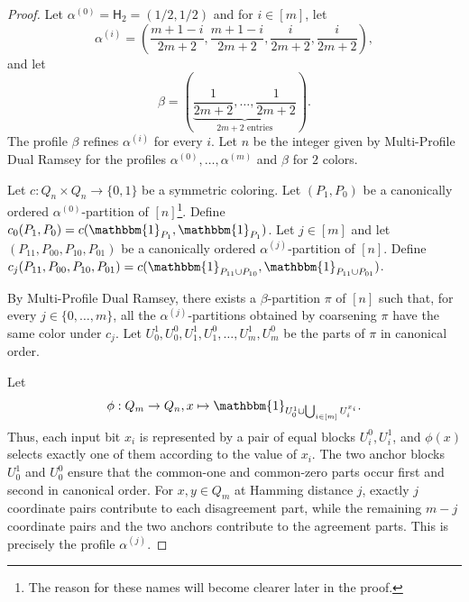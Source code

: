 \documentclass[11pt]{article}
\newcommand{\unif}[1]{\mathsf H_{#1}}
\theoremstyle{remark}
\begin{document}
\begin{proof}
Let $\alpha^{(0)} = \unif{2} = (1/2, 1/2)$ and for $i\in [m]$, let
\[
  \alpha^{(i)}
  =\left(
      \frac{m+1-i}{2m+2},
      \frac{m+1-i}{2m+2},
      \frac{i}{2m+2},
      \frac{i}{2m+2}
    \right),
\]
and let
\[
  \beta
  =\left(
      \underbrace{\frac1{2m+2},\ldots,\frac1{2m+2}}_{2m+2\text{ entries}}
    \right).
\]
The profile $\beta$ refines $\alpha^{(i)}$ for every $i$.
Let $n$ be the integer given by Multi-Profile Dual Ramsey for the profiles $\alpha^{(0)}, \ldots, \alpha^{(m)}$ and $\beta$ for $2$ colors.

Let $c : Q_n \times Q_n \to \{0, 1\}$ be a symmetric coloring.
Let $(P_1, P_0)$ be a canonically ordered $\alpha^{(0)}$-partition of $[n]$\footnote{The reason for these names will become clearer later in the proof.}.
Define $c_0(P_1, P_0) = c(\mathbbm{1}_{P_1}, \mathbbm{1}_{P_1})$.
Let $j \in [m]$ and let $(P_{11}, P_{00}, P_{10}, P_{01})$ be a canonically ordered $\alpha^{(j)}$-partition of $[n]$.
Define $c_j(P_{11}, P_{00}, P_{10}, P_{01}) = c(\mathbbm{1}_{P_{11} \cup P_{10}}, \mathbbm{1}_{P_{11} \cup P_{01}})$.

By Multi-Profile Dual Ramsey, there exists a $\beta$-partition $\pi$ of $[n]$ such that, for every $j \in \{0, \ldots, m\}$, all the $\alpha^{(j)}$-partitions obtained by coarsening $\pi$ have the same color under $c_j$.
Let $U_0^1, U_0^0, U_1^1, U_1^0, \ldots , U_m^1, U_m^0$ be the parts of $\pi$ in canonical order.

Let \[\phi : Q_m \to Q_n, x \mapsto \mathbbm{1}_{U_0^1 \cup \bigcup_{i \in [m]}U_i^{x_i}}.\]
Thus, each input bit $x_i$ is represented by a pair of equal blocks $U_i^0,U_i^1$, and $\phi(x)$ selects exactly one of them according to the value of $x_i$. 
The two anchor blocks $U_0^1$ and $U_0^0$ ensure that the common-one and common-zero parts occur first and second in canonical order.
For $x, y \in Q_m$ at Hamming distance $j$, exactly $j$ coordinate pairs contribute to each disagreement part, while the remaining $m-j$ coordinate pairs and the two anchors contribute to the agreement parts. This is precisely the profile $\alpha^{(j)}$.


\end{proof}
\end{document}
